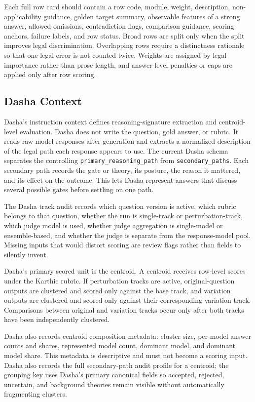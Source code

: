 Each full row card should contain a row code, module, weight, description,
non-applicability guidance, golden target summary, observable features of a
strong answer, allowed omissions, contradiction flags, comparison guidance,
scoring anchors, failure labels, and row status. Broad rows are split only when
the split improves legal discrimination. Overlapping rows require a distinctness
rationale so that one legal error is not counted twice. Weights are assigned by
legal importance rather than prose length, and answer-level penalties or caps
are applied only after row scoring.

\subsection{Dasha Context}

Dasha's instruction context defines reasoning-signature extraction and
centroid-level evaluation. Dasha does not write the question, gold answer, or
rubric. It reads raw model responses after generation and extracts a normalized
description of the legal path each response appears to use. The current Dasha
schema separates the controlling \texttt{primary\_reasoning\_path} from
\texttt{secondary\_paths}. Each secondary path records the gate or theory, its
posture, the reason it mattered, and its effect on the outcome. This lets Dasha
represent answers that discuss several possible gates before settling on one
path.

The Dasha track audit records which question version is active, which rubric
belongs to that question, whether the run is single-track or perturbation-track,
which judge model is used, whether judge aggregation is single-model or
ensemble-based, and whether the judge is separate from the response-model pool.
Missing inputs that would distort scoring are review flags rather than fields to
silently invent.

Dasha's primary scored unit is the centroid. A centroid receives row-level
scores under the Karthic rubric. If perturbation tracks are active,
original-question outputs are clustered and scored only against the base track,
and variation outputs are clustered and scored only against their corresponding
variation track. Comparisons between original and variation tracks occur only
after both tracks have been independently clustered.

Dasha also records centroid composition metadata: cluster size, per-model answer
counts and shares, represented model count, dominant model, and dominant model
share. This metadata is descriptive and must not become a scoring input. Dasha
also records the full secondary-path audit profile for a centroid; the grouping
key uses Dasha's primary canonical fields so accepted, rejected, uncertain, and
background theories remain visible without automatically fragmenting clusters.

